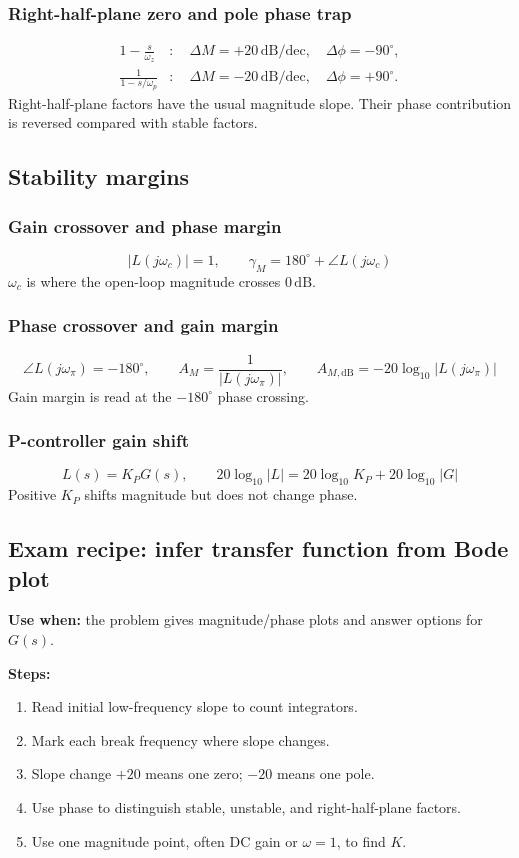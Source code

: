\subsubsection{Right-half-plane zero and pole phase trap}
\[
\begin{aligned}
1-\frac{s}{\omega_z}&:\quad \Delta M=+20\,\mathrm{dB/dec},\quad \Delta\phi=-90^\circ,\\
\frac{1}{1-s/\omega_p}&:\quad \Delta M=-20\,\mathrm{dB/dec},\quad \Delta\phi=+90^\circ.
\end{aligned}
\]
Right-half-plane factors have the usual magnitude slope. Their phase contribution is reversed compared with stable factors.

\subsection{Stability margins}

\subsubsection{Gain crossover and phase margin}
\[
|L(j\omega_c)|=1,\qquad \gamma_M=180^\circ+\angle L(j\omega_c)
\]
\(\omega_c\) is where the open-loop magnitude crosses \(0\,\mathrm{dB}\).

\subsubsection{Phase crossover and gain margin}
\[
\angle L(j\omega_\pi)=-180^\circ,\qquad
A_M=\frac{1}{|L(j\omega_\pi)|},\qquad
A_{M,\mathrm{dB}}=-20\log_{10}|L(j\omega_\pi)|
\]
Gain margin is read at the \(-180^\circ\) phase crossing.

\subsubsection{P-controller gain shift}
\[
L(s)=K_PG(s),\qquad
20\log_{10}|L|=20\log_{10}K_P+20\log_{10}|G|
\]
Positive \(K_P\) shifts magnitude but does not change phase.

\subsection{Exam recipe: infer transfer function from Bode plot}

\textbf{Use when:} the problem gives magnitude/phase plots and answer options for \(G(s)\).

\textbf{Steps:}
\begin{enumerate}
\item Read initial low-frequency slope to count integrators.
\item Mark each break frequency where slope changes.
\item Slope change \(+20\) means one zero; \(-20\) means one pole.
\item Use phase to distinguish stable, unstable, and right-half-plane factors.
\item Use one magnitude point, often DC gain or \(\omega=1\), to find \(K\).
\end{enumerate}

